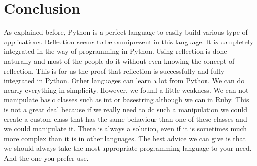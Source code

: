 \section{Conclusion}

As explained before, Python is a perfect language to easily build various type of applications. 
Reflection seems to be omnipresent in this language. 
It is completely integrated in the way of programming in Python.
Using reflection is done naturally and most of the people do it without even knowing the concept of reflection. 
This is for us the proof that reflection is successfully and fully integrated in Python.
Other languages can learn a lot from Python.
We can do nearly everything in simplicity.
However, we found a little weakness.
We can not manipulate basic classes such as int or basestring although we can in Ruby.
This is not a great deal because if we really need to do such a manipulation we could create a custom class that has the same behaviour than one of these classes and we could manipulate it.
There is always a solution, even if it is sometimes much more complex than it is in other languages.
The best advice we can give is that we should always take the most appropriate programming language to your need.
And the one you prefer use.